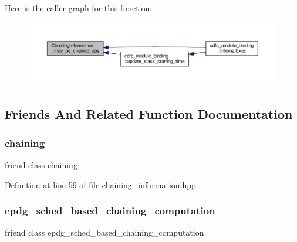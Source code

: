 Here is the caller graph for this function\+:
\nopagebreak
\begin{figure}[H]
\begin{center}
\leavevmode
\includegraphics[width=350pt]{d8/d93/classChainingInformation_a071c018afe565b6950876779213150ec_icgraph}
\end{center}
\end{figure}


\subsection{Friends And Related Function Documentation}
\mbox{\label{classChainingInformation_a7e8da19f51fdf799b828cbba606659a0}} 
\subsubsection{\texorpdfstring{chaining}{chaining}}
{\footnotesize\ttfamily friend class \hyperlink{classchaining}{chaining}\hspace{0.3cm}{\ttfamily [friend]}}



Definition at line 59 of file chaining\+\_\+information.\+hpp.

\mbox{\label{classChainingInformation_af50e06247a1defeb16375345a18b30a2}} 
\subsubsection{\texorpdfstring{epdg\+\_\+sched\+\_\+based\+\_\+chaining\+\_\+computation}{epdg\_sched\_based\_chaining\_computation}}
{\footnotesize\ttfamily friend class epdg\+\_\+sched\+\_\+based\+\_\+chaining\+\_\+computation\hspace{0.3cm}{\ttfamily [friend]}}



